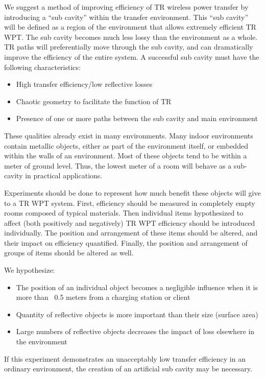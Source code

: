 We suggest a method of improving efficiency of TR wireless power transfer by introducing a ``sub cavity'' within the transfer environment. This ``sub cavity'' will be defined as a region of the environment that allows extremely efficient TR WPT. The sub cavity becomes much less lossy than the environment as a whole. TR paths will preferentially move through the sub cavity, and can dramatically improve the efficiency of the entire system. A successful sub cavity must have the following characteristics:

\begin{itemize}
  \item High transfer efficiency/low reflective losses
  \item Chaotic geometry to facilitate the function of TR
  \item Presence of one or more paths between the sub cavity and main environment
\end{itemize}

These qualities already exist in many environments. Many indoor environments contain metallic objects, either as part of the environment itself, or embedded within the walls of an environment. Most of these objects tend to be within a meter of ground level. Thus, the lowest meter of a room will behave as a sub-cavity in practical applications.

Experiments should be done to represent how much benefit these objects will give to a TR WPT system. First, efficiency should be measured in completely empty rooms composed of typical materials. Then individual items hypothesized to affect (both positively and negatively) TR WPT efficiency should be introduced individually. The position and arrangement of these items should be altered, and their impact on efficiency quantified. Finally, the position and arrangement of groups of items should be altered as well.

We hypothesize:
\begin{itemize}
  \item The position of an individual object becomes a negligible influence when it is more than ~0.5 meters from a charging station or client
  \item Quantity of reflective objects is more important than their size (surface area)
  \item Large numbers of reflective objects decreases the impact of loss elsewhere in the environment
\end{itemize}

If this experiment demonstrates an unacceptably low transfer efficiency in an ordinary environment, the creation of an artificial sub cavity may be necessary.

